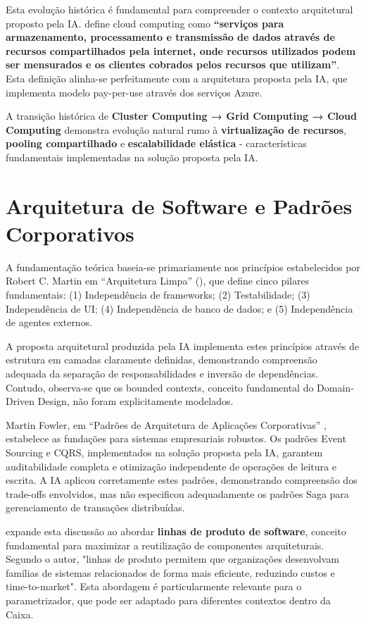 Esta evolução histórica é fundamental para compreender o contexto arquitetural proposto pela IA.  define cloud computing como \textbf{``serviços para armazenamento, processamento e transmissão de dados através de recursos compartilhados pela internet, onde recursos utilizados podem ser mensurados e os clientes cobrados pelos recursos que utilizam''}. Esta definição alinha-se perfeitamente com a arquitetura proposta pela IA, que implementa modelo pay-per-use através dos serviços Azure.

A transição histórica de \textbf{Cluster Computing → Grid Computing → Cloud Computing}  demonstra evolução natural rumo à \textbf{virtualização de recursos}, \textbf{pooling compartilhado} e \textbf{escalabilidade elástica} - características fundamentais implementadas na solução proposta pela IA.

\section{Arquitetura de Software e Padrões Corporativos}

A fundamentação teórica baseia-se primariamente nos princípios estabelecidos por Robert C. Martin em ``Arquitetura Limpa'' (), que define cinco pilares fundamentais: (1) Independência de frameworks; (2) Testabilidade; (3) Independência de UI; (4) Independência de banco de dados; e (5) Independência de agentes externos.

A proposta arquitetural produzida pela IA implementa estes princípios através de estrutura em camadas claramente definidas, demonstrando compreensão adequada da separação de responsabilidades e inversão de dependências. Contudo, observa-se que os bounded contexts, conceito fundamental do Domain-Driven Design, não foram explicitamente modelados.

Martin Fowler, em ``Padrões de Arquitetura de Aplicações Corporativas'' , estabelece as fundações para sistemas empresariais robustos. Os padrões Event Sourcing e CQRS, implementados na solução proposta pela IA, garantem auditabilidade completa e otimização independente de operações de leitura e escrita. A IA aplicou corretamente estes padrões, demonstrando compreensão dos trade-offs envolvidos, mas não especificou adequadamente os padrões Saga para gerenciamento de transações distribuídas.

 expande esta discussão ao abordar \textbf{linhas de produto de software}, conceito fundamental para maximizar a reutilização de componentes arquiteturais. Segundo o autor, "linhas de produto permitem que organizações desenvolvam famílias de sistemas relacionados de forma mais eficiente, reduzindo custos e time-to-market". Esta abordagem é particularmente relevante para o parametrizador, que pode ser adaptado para diferentes contextos dentro da Caixa.

